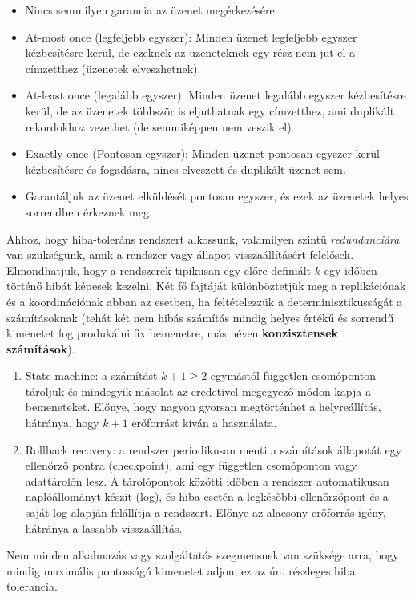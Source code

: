 \documentclass[a4paper,12pt]{article}
\begin{document}
\begin{itemize}
\item Nincs semmilyen garancia az üzenet megérkezésére.
\item At-most once (legfeljebb egyszer): Minden üzenet legfeljebb egyszer kézbesítésre kerül, de ezeknek az üzeneteknek egy rész nem jut el a címzetthez (üzenetek elveszhetnek).
\item At-least once (legalább egyszer): Minden üzenet legalább egyszer kézbesítésre kerül, de az üzenetek többször is eljuthatnak egy címzetthez, ami duplikált rekordokhoz vezethet (de semmiképpen nem veszik el).
\item Exactly once (Pontosan egyszer): Minden üzenet pontosan egyszer kerül kézbesítésre és fogadásra, nincs elveszett és duplikált üzenet sem.
\item Garantáljuk az üzenet elküldését pontosan egyszer, és ezek az üzenetek helyes sorrendben érkeznek meg.
\end{itemize}

Ahhoz, hogy hiba-toleráns rendszert alkossunk, valamilyen szintű \textit{redundanciára} van szükségünk, amik a rendszer vagy állapot visszaállításért felelősek. Elmondhatjuk, hogy a rendszerek tipikusan egy előre definiált $k$ egy időben történő hibát képesek kezelni. Két\cite{balazinska} fő fajtáját különböztetjük meg a replikációnak és a koordinációnak abban az esetben, ha feltételezzük a determinisztikusságát a számításoknak (tehát két nem hibás számítás mindig helyes értékű és sorrendű kimenetet fog produkálni fix bemenetre, más néven \textbf{konzisztensek számítások}). 

\begin{enumerate}
\item State-machine: a számítást $k+1\ge2$ egymástól független csomóponton tároljuk és mindegyik másolat az eredetivel megegyező módon kapja a bemeneteket. Előnye, hogy nagyon gyorsan megtörténhet a helyreállítás, hátránya, hogy $k+1$ erőforrást kíván a használata.
\item Rollback recovery: a rendszer periodikusan menti a számítások állapotát egy ellenőrző pontra (checkpoint), ami egy független csomóponton vagy adattárolón lesz. A tárolópontok közötti időben a rendszer automatikusan naplóállományt készít (log), és hiba esetén a legkésőbbi ellenőrzőpont és a saját log alapján felállítja a rendszert. Előnye az alacsony erőforrás igény, hátránya a lassabb visszaállítás. 
\end{enumerate}

Nem minden alkalmazás vagy szolgáltatás szegmensnek van szüksége arra, hogy mindig maximális pontosságú kimenetet adjon, ez az ún. részleges hiba tolerancia. 
\end{document}
